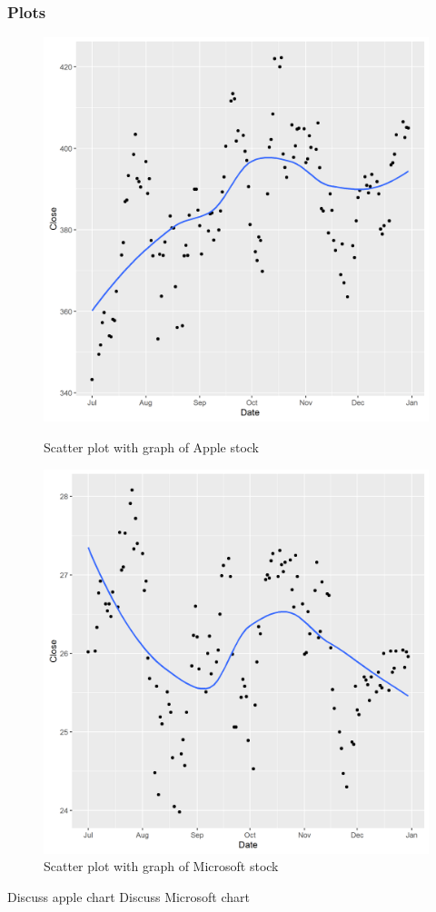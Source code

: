 \documentclass[paper=a4, fontsize=11pt]{scrartcl} %
\numberwithin{equation}{section} %
\numberwithin{figure}{section} %
\numberwithin{table}{section} %
\begin{document}
\subsubsection{Plots}
\begin{figure}[!htb]
  \includegraphics[width=\linewidth]{graph/AAPL2.png}
  \caption{Scatter plot with graph of Apple stock}
\endminipage\hfill
{}
  \includegraphics[width=\linewidth]{graph/MSFT2.png}
  \caption{Scatter plot with graph of Microsoft stock}
\endminipage\hfill

\end{figure}
Discuss apple chart
Discuss Microsoft chart
\end{document}
